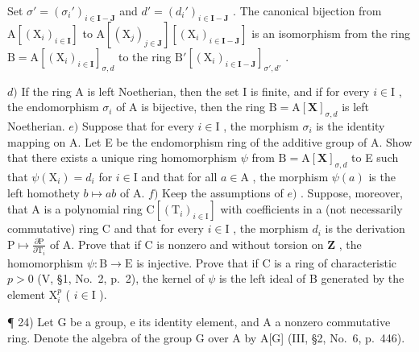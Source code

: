 Set \(\sigma' = (\sigma_i')_{i \in \mathbf{I} - \mathbf{J}}\) and \(d' = (d_i')_{i \in \mathbf{I} - \mathbf{J}}\) . The canonical bijection from \(\mathrm{A}[(\mathrm{X}_i)_{i \in \mathbf{I}}]\) to \(\mathrm{A}[(\mathrm{X}_j)_{j \in \mathbf{J}}][(\mathrm{X}_i)_{i \in \mathbf{I} - \mathbf{J}}]\) is an isomorphism from the ring \(\mathrm{B} = \mathrm{A}[(\mathrm{X}_i)_{i \in \mathbf{I}}]_{\sigma, d}\) to the ring \(\mathrm{B}'[(\mathrm{X}_i)_{i \in \mathbf{I} - \mathbf{J}}]_{\sigma', d'}\) .

\(d)\) If the ring A is left Noetherian, then the set I is finite, and if for every \(i \in \mathrm{I}\) , the endomorphism \(\sigma_i\) of A is bijective, then the ring \(\mathrm{B} = \mathrm{A}[\mathbf{X}]_{\sigma,d}\) is left Noetherian. \(e)\) Suppose that for every \(i \in \mathrm{I}\) , the morphism \(\sigma_i\) is the identity mapping on A. Let E be the endomorphism ring of the additive group of A. Show that there exists a unique ring homomorphism \(\psi\) from \(\mathrm{B} = \mathrm{A}[\mathbf{X}]_{\sigma,d}\) to E such that \(\psi(\mathrm{X}_i) = d_i\) for \(i \in \mathrm{I}\) and that for all \(a \in \mathrm{A}\) , the morphism \(\psi(a)\) is the left homothety \(b \mapsto ab\) of A. \(f)\) Keep the assumptions of \(e)\) . Suppose, moreover, that A is a polynomial ring \(\mathrm{C}[(\mathrm{T}_i)_{i \in \mathrm{I}}]\) with coefficients in a (not necessarily commutative) ring C and that for every \(i \in \mathrm{I}\) , the morphism \(d_i\) is the derivation \(\mathrm{P} \mapsto \frac{\partial\mathrm{P}}{\partial\mathrm{T}_i}\) of A. Prove that if C is nonzero and without torsion on \(\mathbf{Z}\) , the homomorphism \(\psi: \mathrm{B} \to \mathrm{E}\) is injective. Prove that if C is a ring of characteristic \(p > 0\) (V, §1, No.~2, p.~2), the kernel of \(\psi\) is the left ideal of B generated by the element \(\mathrm{X}_i^p\) ( \(i \in \mathrm{I}\) ).

¶ 24) Let G be a group, e its identity element, and A a nonzero commutative ring. Denote the algebra of the group G over A by A{[}G{]} (III, §2, No.~6, p.~446).

